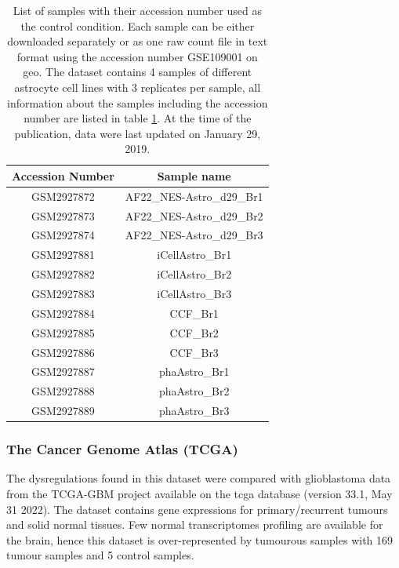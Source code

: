 \begin{table}
    \centering
    \begin{tabular}{ |c|c| }
        \hline
        Accession Number & Sample name \\
        \hline
        GSM2927872 & AF22\_NES-Astro\_d29\_Br1 \\
        GSM2927873 & AF22\_NES-Astro\_d29\_Br2 \\
        GSM2927874 & AF22\_NES-Astro\_d29\_Br3 \\
        \hline
        GSM2927881 & iCellAstro\_Br1 \\
        GSM2927882 & iCellAstro\_Br2 \\
        GSM2927883 & iCellAstro\_Br3 \\
        \hline
        GSM2927884 & CCF\_Br1 \\
        GSM2927885 & CCF\_Br2 \\
        GSM2927886 & CCF\_Br3 \\
        \hline
        GSM2927887 & phaAstro\_Br1 \\ 
        GSM2927888 & phaAstro\_Br2 \\ 
        GSM2927889 & phaAstro\_Br3 \\ 
        \hline
    \end{tabular}
    \caption{
        List of samples with their accession number used as the control condition.
        Each sample can be either downloaded separately or as one raw count file in text format using the accession number GSE109001 on \acrfull{geo}.
        The dataset contains 4 samples of different astrocyte cell lines with 3 replicates per sample, all information about the samples including the accession number are listed in table \ref*{table:list-control-samples}.
        At the time of the publication, data were last updated on January 29, 2019.
    }
    \label{table:list-control-samples}
\end{table}

\subsubsection{The Cancer Genome Atlas (TCGA) }

The dysregulations found in this dataset were compared with glioblastoma data from the TCGA-GBM project available on the \acrshort{tcga} database (version 33.1, May 31 2022).
The dataset contains gene expressions for primary/recurrent tumours and solid normal tissues.
Few normal transcriptomes profiling are available for the brain, hence this dataset is over-represented by tumourous samples with 169 tumour samples and 5 control samples.

